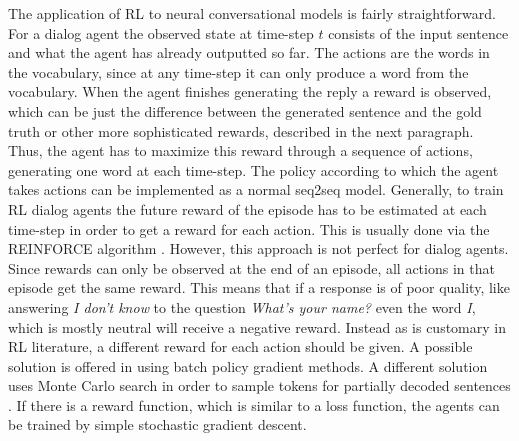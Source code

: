 \documentclass[12pt]{article}
\begin{document}
The application of RL to neural conversational models is fairly straightforward. For a dialog agent the observed state at time-step \(t\) consists of the input sentence and what the agent has already outputted so far. The actions are the words in the vocabulary, since at any time-step it can only produce a word from the vocabulary. When the agent finishes generating the reply a reward is observed, which can be just the difference between the generated sentence and the gold truth or other more sophisticated rewards, described in the next paragraph. Thus, the agent has to maximize this reward through a sequence of actions, generating one word at each time-step. The policy according to which the agent takes actions can be implemented as a normal seq2seq model. Generally, to train RL dialog agents the future reward of the episode has to be estimated at each time-step in order to get a reward for each action. This is usually done via the REINFORCE algorithm \cite{Williams:1992}. However, this approach is not perfect for dialog agents. Since rewards can only be observed at the end of an episode, all actions in that episode get the same reward. This means that if a response is of poor quality, like answering \textit{I don't know} to the question \textit{What's your name?} even the word \textit{I}, which is mostly neutral will receive a negative reward.  Instead as is customary in RL literature, a different reward for each action should be given. A possible solution is offered in \cite{Kandasamy:2017} using batch policy gradient methods. A different solution uses Monte Carlo search in order to sample tokens for partially decoded sentences \cite{Li_adversarial:2017}. If there is a reward function, which is similar to a loss function, the agents can be trained by simple stochastic gradient descent.
\end{document}
